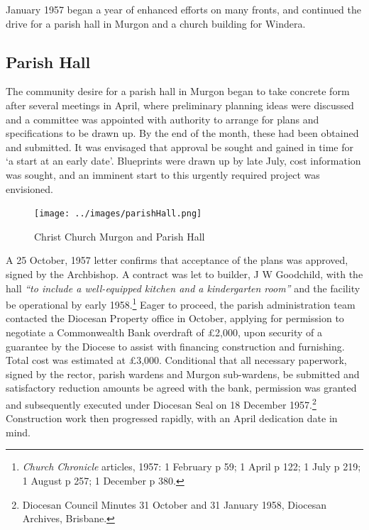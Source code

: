 January 1957 began a year of enhanced efforts on many fronts, and continued the drive for a parish hall in Murgon and a church building for Windera.



\subsection{Parish Hall}



The community desire for a parish hall in Murgon began to take concrete form after several meetings in April, where preliminary planning ideas were discussed and a committee was appointed with authority to arrange for plans and specifications to be drawn up. By the end of the month, these had been obtained and submitted. It was envisaged that approval be sought and gained in time for `a start at an early date'. Blueprints were drawn up by late July, cost information was sought, and an imminent start to this urgently required project was envisioned.









\begin{figure}[!htb]
\begin{center}
\texttt{[image: ../images/parishHall.png]}
\caption{Christ Church Murgon and Parish Hall}
\end{center}
\end{figure}




A 25 October, 1957 letter confirms that acceptance of the plans was approved, signed by the Archbishop. A contract was let to builder, J W Goodchild, with the hall \emph{``to include a well-equipped kitchen and a kindergarten room''} and the facility be operational by early 1958.\footnote{\emph{Church Chronicle} articles, 1957: 1 February p 59; 1 April p 122; 1 July p 219; 1 August p 257; 1 December p 380.} Eager to proceed, the parish administration team contacted the Diocesan Property office in October, applying for permission to negotiate a Commonwealth Bank overdraft of \pounds2,000, upon security of a guarantee by the Diocese to assist with financing construction and furnishing. Total cost was estimated at \pounds3,000. Conditional that all necessary paperwork, signed by the rector, parish wardens and Murgon sub-wardens, be submitted and satisfactory reduction amounts be agreed with the bank, permission was granted and subsequently executed under Diocesan Seal on 18 December 1957.\footnote{Diocesan Council Minutes 31 October and 31 January 1958, Diocesan Archives, Brisbane.} Construction work then progressed rapidly, with an April dedication date in mind.


